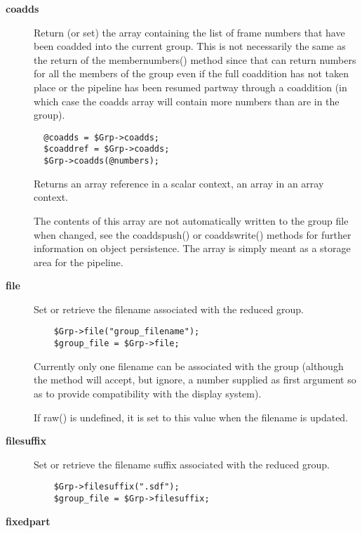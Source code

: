\begin{description}
\item[\textbf{coadds}] \mbox{}

Return (or set) the array containing the list of frame numbers that have
been coadded into the current group. This is not necessarily the same
as the return of the membernumbers() method since that can return numbers
for all the members of the group even if the full coaddition has not
taken place or the pipeline has been resumed partway through a coaddition
(in which case the coadds array will contain more numbers than are in the
group).

\begin{verbatim}
  @coadds = $Grp->coadds;
  $coaddref = $Grp->coadds;
  $Grp->coadds(@numbers);
\end{verbatim}


Returns an array reference in a scalar context, an array in an
array context.



The contents of this array are not automatically written to the 
group file when changed, see the coaddspush() or coaddswrite() methods
for further information on object persistence. The array is simply
meant as a storage area for the pipeline.

\item[\textbf{file}] \mbox{}

Set or retrieve the filename associated with the
reduced group.

\begin{verbatim}
    $Grp->file("group_filename");
    $group_file = $Grp->file;
\end{verbatim}


Currently only one filename can be associated with the group
(although the method will accept, but ignore, a number supplied
as first argument so as to provide compatibility with the
display system).



If raw() is undefined, it is set to this value when the filename is updated.

\item[\textbf{filesuffix}] \mbox{}

Set or retrieve the filename suffix associated with the
reduced group.

\begin{verbatim}
    $Grp->filesuffix(".sdf");
    $group_file = $Grp->filesuffix;
\end{verbatim}
\item[\textbf{fixedpart}] \mbox{}


\end{description}
